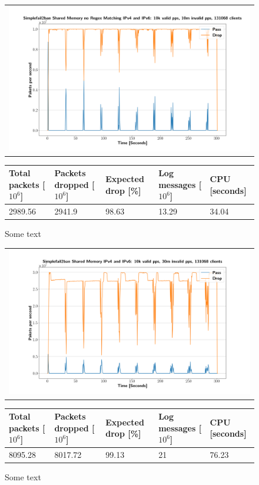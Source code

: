 \begin{figure}[p]
	\label{fig:simplefail2ban:shm:nr}
	\centering
	\scriptsize
	\begin{tabular}{c}
    	\centerline{\includegraphics[width=1.2\textwidth]{images/simplefail2ban_shm_nr_ipv46_v10k_iv10m_c131068.png}}
	\end{tabular}
	\begin{tabular}{lllll}
		\toprule
		\textbf{Total packets [$10^6$]} & \textbf{Packets dropped [$10^6$]} & \textbf{Expected drop [\%]} & \textbf{Log messages [$10^6$]} & \textbf{CPU [seconds]} \\ \midrule 
		2989.56 & 2941.9 & 98.63 & 13.29 & 34.04 \\
		\bottomrule
	\end{tabular}
	\caption[Simplefail2ban Shared Memory without Regex Matching]{Some text}
\end{figure}

\begin{figure}[p]
	\label{fig:simplefail2ban:shm:ip46:30m}
	\centering
	\scriptsize
	\begin{tabular}{c}
    	\centerline{\includegraphics[width=1.2\textwidth]{images/simplefail2ban_shm_ipv46_v10k_iv30m_c131068.png}}
	\end{tabular}
	\begin{tabular}{lllll}
		\toprule
		\textbf{Total packets [$10^6$]} & \textbf{Packets dropped [$10^6$]} & \textbf{Expected drop [\%]} & \textbf{Log messages [$10^6$]} & \textbf{CPU [seconds]} \\ \midrule 
		8095.28 & 8017.72 & 99.13 & 21 & 76.23 \\
		\bottomrule
	\end{tabular}
	\caption[Simplefail2ban Shared Memory IPv4 \& IPv6, 30m PPS]{Some text}
\end{figure}
